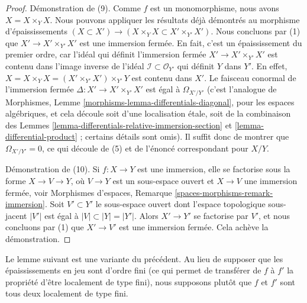 \begin{proof}
\medskip\noindent
Démonstration de (9). Comme $f$ est un monomorphisme, nous avons $X = X \times_Y X$.
Nous pouvons appliquer les résultats déjà démontrés au morphisme
d'épaississements $(X \subset X') \to (X \times_Y X \subset X' \times_{Y'} X')$.
Nous concluons par (1) que $X' \to X' \times_{Y'} X'$ est une immersion fermée.
En fait, c'est un épaississement du premier ordre, car l'idéal qui définit
l'immersion fermée $X' \to X' \times_{Y'} X'$ est contenu dans l'image inverse
de l'idéal $\mathcal{I} \subset \mathcal{O}_{Y'}$ qui définit $Y$ dans $Y'$.
En effet, $X = X \times_Y X = (X' \times_{Y'} X') \times_{Y'} Y$ est contenu
dans $X'$. Le faisceau conormal de l'immersion fermée
$\Delta : X' \to X' \times_{Y'} X'$ est égal à $\Omega_{X'/Y'}$
(c'est l'analogue de
Morphismes, Lemme \ref{morphisms-lemma-differentials-diagonal},
pour les espaces algébriques, et cela découle soit d'une localisation étale,
soit de la combinaison des
Lemmes \ref{lemma-differentials-relative-immersion-section} et
\ref{lemma-differential-product} ; certains détails sont omis).
Il suffit donc de montrer que $\Omega_{X'/Y'} = 0$, ce qui découle de (5)
et de l'énoncé correspondant pour $X/Y$.

\medskip\noindent
Démonstration de (10). Si $f : X \to Y$ est une immersion, elle se factorise sous la forme
$X \to V \to Y$, où $V \to Y$ est un sous-espace ouvert et $X \to V$ une
immersion fermée, voir
Morphismes d'espaces, Remarque \ref{spaces-morphisms-remark-immersion}.
Soit $V' \subset Y'$ le sous-espace ouvert dont
l'espace topologique sous-jacent $|V'|$ est égal à $|V| \subset |Y| = |Y'|$.
Alors $X' \to Y'$ se factorise par $V'$, et nous concluons par (1) que $X' \to V'$
est une immersion fermée. Cela achève la démonstration.
\end{proof}

\noindent
Le lemme suivant est une variante du précédent. Au lieu de supposer
que les épaississements en jeu sont d'ordre fini (ce qui permet de transférer
de $f$ à $f'$ la propriété d'être localement de type fini),
nous supposons plutôt que $f$ et $f'$ sont tous deux localement
de type fini.

